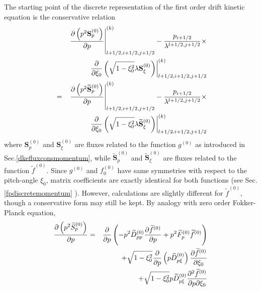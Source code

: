 

The starting point of the discrete representation of the first order drift
kinetic equation is the conservative relation
\begin{eqnarray}
&&\left. \frac{\partial \left( p^{2}\mathbf{S}_{p}^{\left( 0\right) }\right)
}{\partial p}\right| _{l+1/2,i+1/2,j+1/2}^{(k)}-\frac{p_{i+1/2}}{\lambda
^{l+1/2,j+1/2}}\times   \nonumber \\
&&\left. \frac{\partial }{\partial \xi _{0}}\left( \sqrt{1-\xi _{0}^{2}}%
\lambda \mathbf{S}_{\xi }^{\left( 0\right) }\right) \right|
_{l+1/2,i+1/2,j+1/2}^{(k)}  \nonumber \\
&=&\left. \frac{\partial \left( p^{2}\widetilde{\mathbf{S}}_{p}^{\left(
0\right) }\right) }{\partial p}\right| _{l+1/2,i+1/2,j+1/2}^{(k)}-\frac{%
p_{i+1/2}}{\lambda ^{l+1/2,j+1/2}}\times   \nonumber \\
&&\left. \frac{\partial }{\partial \xi _{0}}\left( \sqrt{1-\xi _{0}^{2}}%
\lambda \widetilde{\mathbf{S}}_{\xi }^{\left( 0\right) }\right) \right|
_{l+1/2,i+1/2,j+1/2}^{(k)}
\end{eqnarray}
where $\mathbf{S}_{p}^{\left( 0\right) }$ and $\mathbf{S}_{\xi }^{\left(
0\right) }$ are fluxes related to the function $g^{\left( 0\right) }$ as
introduced in Sec.\ref{dkefluxconsmomentum}, while $\widetilde{\mathbf{S}}%
_{p}^{\left( 0\right) }$ and $\widetilde{\mathbf{S}}_{\xi }^{\left( 0\right)
}$ are fluxes related to the function $\widetilde{f}^{\left( 0\right) }$.
Since $g^{\left( 0\right) }$ and $f_{0}^{\left( 0\right) }$ have same
symmetries with respect to the pitch-angle $\xi _{0}$, matrix coefficients
are exactly identical for both functions (see Sec. \ref{fpdiscretemomentum}%
). However, calculations are slightly different for $\widetilde{f}^{\left(
0\right) },$ though a conservative form may still be kept. By analogy with
zero order Fokker-Planck equation,
\begin{eqnarray}
\frac{\partial \left( p^{2}\widetilde{S}_{p}^{\left( 0\right) }\right) }{%
\partial p} &=&\frac{\partial }{\partial p}\left( -p^{2}\widetilde{D}%
_{pp}^{\left( 0\right) }\frac{\partial \widetilde{f}^{\left( 0\right) }}{%
\partial p}+p^{2}\widetilde{F}_{p}^{\left( 0\right) }\widetilde{f}^{\left(
0\right) }\right)   \nonumber \\
&&+\sqrt{1-\xi _{0}^{2}}\frac{\partial }{\partial p}\left( p\widetilde{D}%
_{p\xi }^{\left( 0\right) }\right) \frac{\partial \widetilde{f}^{\left(
0\right) }}{\partial \xi _{0}}  \nonumber \\
&&+\sqrt{1-\xi _{0}^{2}}p\widetilde{D}_{p\xi }^{\left( 0\right) }\frac{%
\partial ^{2}\widetilde{f}^{\left( 0\right) }}{\partial p\partial \xi _{0}}
\end{eqnarray}
